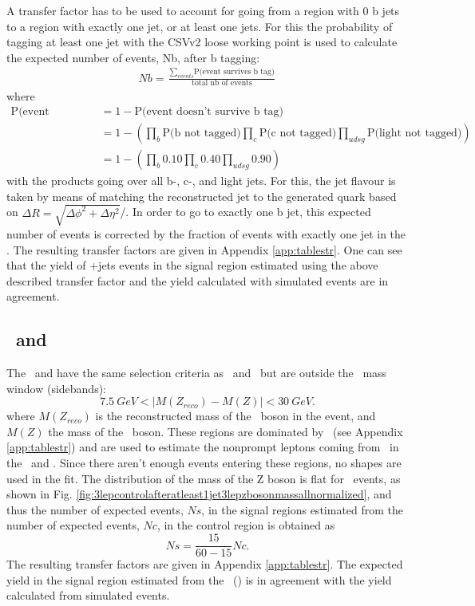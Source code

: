 A transfer factor has to be used to account for going from a region with 0 b jets to a region with exactly one jet, or at least one jets. For this the probability of tagging at least one jet with the CSVv2 loose working point is used to calculate the expected number of events, Nb, after b tagging: 
\begin{align}
	Nb = \frac{\sum_{events}\text{P(event survives b tag)}}{\text{total nb of events}}
\end{align}
where 
\begin{align}
	\text{P(event survives b tag )} &= 1 - \text{P(event doesn't survive b tag)}\\
	& = 1 - \left(\prod_{b} \text{P(b not tagged)} \prod_{c} \text{P(c not tagged)} \prod_{udsg} \text{P(light not tagged)}\right)\\
	& = 1 - \left(\prod_{b} 0.10 \prod_{c} 0.40 \prod_{udsg} 0.90\right)
\end{align}
with the products going over all b-, c-, and light jets. For this, the jet flavour is taken by means of matching the reconstructed jet to the generated quark based on $\Delta R = \sqrt{\Delta \phi^2 + \Delta \eta^2}$/.  
In order to go to exactly one b jet, this expected number of events is corrected by the fraction of events with exactly  one jet in the \WZCR. The resulting transfer factors are given in Appendix \ref{app:tablestr}. One can see  that the yield of \WZ+jets events in the signal region estimated using the above described transfer factor and the yield calculated with simulated events are in agreement. 

\subsection{\TTCR\ and \STCR}
The \TTCR\ and \STCR have the same selection criteria as \TTSR\ and \STSR\, but are outside the \PZ\ mass window (sidebands): 
\begin{equation}
7.5 \: GeV < |M(Z_{reco}) - M(Z)| < 30 \:GeV. 
\end{equation}
where $M(Z_{reco})$ is the reconstructed mass of the \PZ\ boson in the event, and $M(Z)$ the mass of the \PZ\ boson.
These regions are dominated by \ttbar\ (see Appendix \ref{app:tablestr}) and are used to estimate the nonprompt  leptons coming from \ttbar\ in the \STSR\ and \TTSR. Since there aren't enough events entering these regions, no shapes are used in the fit. The distribution of the mass of the Z boson is flat for \ttbar\ events, as shown in Fig. \ref{fig:3lepcontrolafteratleast1jet3lepzbosonmassallnormalized},  and thus the number of expected events, $Ns$, in the signal regions estimated from the number of expected events, $Nc$, in the control region is obtained as
\begin{equation}
Ns = \frac{15}{60-15} Nc.
\end{equation}
The resulting transfer factors are given in Appendix \ref{app:tablestr}. The expected yield in the signal region estimated from the \TTCR\ (\STCR) is in agreement with the yield calculated from simulated events. 


